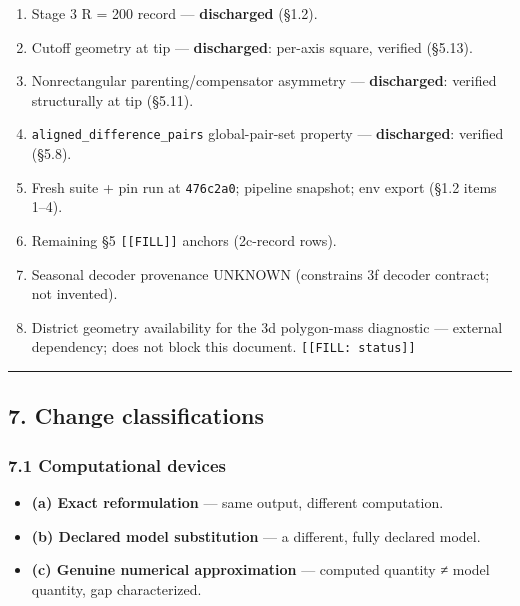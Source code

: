 \documentclass[
  10pt,
]{article}
\def\st#1{#1}  %
\providecommand{\tightlist}{%
  \setlength{\itemsep}{0pt}\setlength{\parskip}{0pt}}
\begin{document}
\begin{enumerate}
\def\labelenumi{\arabic{enumi}.}
\setcounter{enumi}{10}
\tightlist
\item
  \st{Stage 3 R = 200 record} --- \textbf{discharged} (§1.2).
\item
  \st{Cutoff geometry at tip} --- \textbf{discharged}: per-axis square, verified (§5.13).
\item
  \st{Nonrectangular parenting/compensator asymmetry} --- \textbf{discharged}: verified structurally at tip (§5.11).
\item
  \st{\mbox{\texttt{aligned\_\allowbreak{}difference\_\allowbreak{}pairs}} global-pair-set property} --- \textbf{discharged}: verified (§5.8).
\item
  Fresh suite + pin run at \texttt{476c2a0}; pipeline snapshot; env export (§1.2 items 1--4).
\item
  Remaining §5 \texttt{{[}{[}FILL{]}{]}} anchors (2c-record rows).
\item
  Seasonal decoder provenance UNKNOWN (constrains 3f decoder contract; not invented).
\item
  District geometry availability for the 3d polygon-mass diagnostic --- external dependency; does not block this document. \texttt{{[}{[}FILL:\ status{]}{]}}
\end{enumerate}

\begin{center}\rule{0.5\linewidth}{0.5pt}\end{center}

\hypertarget{change-classifications}{%
\subsection{7. Change classifications}\label{change-classifications}}

\hypertarget{computational-devices}{%
\subsubsection{7.1 Computational devices}\label{computational-devices}}

\begin{itemize}
\tightlist
\item
  \textbf{(a) Exact reformulation} --- same output, different computation.
\item
  \textbf{(b) Declared model substitution} --- a different, fully declared model.
\item
  \textbf{(c) Genuine numerical approximation} --- computed quantity ≠ model quantity, gap characterized.
\end{itemize}
\end{document}
